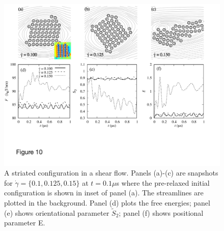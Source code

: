 \documentclass[prb,preprint,showpacs,preprintnumbers,amsmath,amssymb,longbibliography]{revtex4-1}
\begin{document}

\begin{figure}
  \begin{center}
\includegraphics[width=1.0\textwidth]{Figures/Figure10.pdf}        
  \end{center}
      \caption{\label{fig:BC3_shear}  A striated configuration in a shear flow. Panels (a)-(c) are snapshots for $\dot \gamma = \{0.1, 0.125, 0.15\}$ at $t=0.1\mu$s where the pre-relaxed initial configuration is shown in inset of panel (a). The streamlines are plotted in the background.
Panel (d) plots the free energies; panel (e) shows orientational parameter $\tilde{S}_2$; panel (f) shows positional parameter E.
    }
\end{figure}
\end{document}

